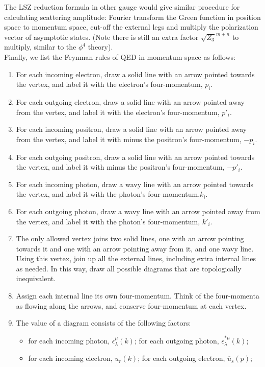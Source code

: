 \noindent
The LSZ reduction formula in other gauge would give similar procedure for calculating scattering amplitude: Fourier transform the Green function in position space to momentum space, cut-off the external legs and multiply the polarization vector of asymptotic states. (Note there is still an extra factor $\sqrt{Z_3}^{m+n}$ to multiply, similar to the $\phi^4$ theory).\\
Finally, we list the Feynman rules of QED in momentum space as follows:
\begin{enumerate}
\item For each incoming electron, draw a solid line with an arrow pointed towards the vertex, and label it with the electron's four-momentum, $p_i$.
\item For each outgoing electron, draw a solid line with an arrow pointed away from the vertex, and label it with the electron's four-momentum, $p'_i$.
\item For each incoming positron, draw a solid line with an arrow pointed away from the vertex, and label it with minus the positron's four-momentum, $-p_i$.
\item For each outgoing positron, draw a solid line with an arrow pointed towards the vertex, and label it with minus the positron's four-momentum, $-p'_i$.
\item For each incoming photon, draw a wavy line with an arrow pointed towards the vertex, and label it with the photon's four-momentum,$k_i$.
\item For each outgoing photon, draw a wavy line with an arrow pointed away from the vertex, and label it with the photon's four-momentum, $k'_i$.
\item The only allowed vertex joins two solid lines, one with an arrow pointing towards it and one with an arrow pointing away from it, and one wavy line. Using this vertex, join up all the external lines, including extra internal lines as needed. In this way, draw all possible diagrams that are topologically inequivalent.
\item Assign each internal line its own four-momentum. Think of the four-momenta as flowing along the arrows, and conserve four-momentum at each vertex. 
\item The value of a diagram consists of the following factors:
\begin{itemize}
\item for each incoming photon, $\epsilon^{\mu}_{\lambda}(k)$; 
for each outgoing photon, $\epsilon^{*\mu}_{\lambda}(k)$;
\item for each incoming electron, $u_{r}(k)$; for each outgoing electron, $\overline{u}_{s}(p)$;

\end{itemize}
\end{enumerate}
